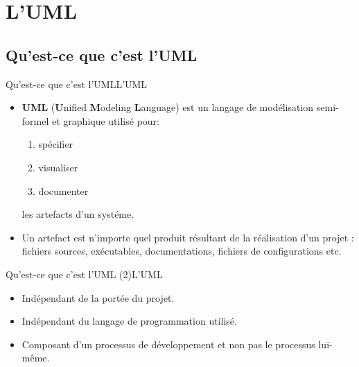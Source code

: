 \documentclass{beamer}
\begin{document}
\section{L'UML}

  \subsection{Qu'est-ce que c'est l'UML}
    \begin{frame}{Qu'est-ce que c'est l'UML}{L'UML}
      \begin{itemize}
        \item{
          \textbf{UML} (\textbf{U}nified \textbf{M}odeling \textbf{L}anguage) est un langage de modélisation semi-formel et graphique utilisé pour:
            \begin{enumerate}
                \item {spécifier}
                \item {visualiser}
                \item {documenter}
            \end{enumerate}
          les artefacts d'un systéme.
          \pause
        }
        \item {Un \og artefact \fg{} est n'importe quel produit résultant de la réalisation d'un projet : fichiers sources, exécutables, documentations, fichiers de configurations etc.}
      \end{itemize}
    \end{frame}

    \begin{frame}{Qu'est-ce que c'est l'UML (2)}{L'UML}
      \begin{itemize}
        \item {Indépendant de la portée du projet.\pause}
        \item<2->{Indépendant du langage de programmation utilisé.}
        \item<3->{Composant d'un processus de développement et non pas le processus lui-même.}
      \end{itemize}
    \end{frame}

\end{document}
